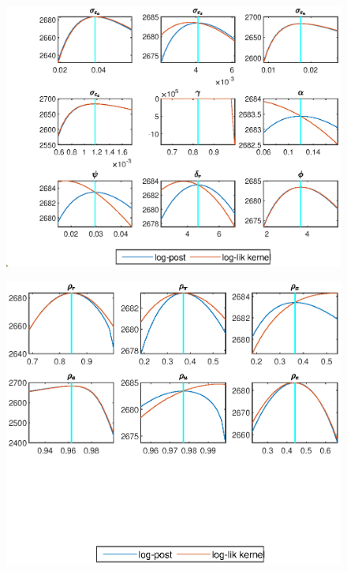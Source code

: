 \documentclass[11pt,preprint, authoryear]{elsarticle}
\let\origfigure\figure
\let\endorigfigure\endfigure
\renewenvironment{figure}[1][2] {
    \expandafter\origfigure\expandafter[H]
} {
    \endorigfigure
}
\numberwithin{equation}{section}
\numberwithin{figure}{section}
\numberwithin{table}{section}
\begin{document}
\begin{figure}
     \centering
     \begin{subfigure}[H]{0.49\textwidth}
         \centering
         \includegraphics[width=\textwidth]{code/mode_check1_extended}
     \end{subfigure}
     \begin{subfigure}[H]{0.49\textwidth}
         \centering
         \includegraphics[width=\textwidth]{code/mode_check2_extended}
     \end{subfigure}
        \caption{Estimated structural parameters mode check plots for extended sample under the Taylor rule (\ref{s1}). The difference in the shapes of the likelihood kernel (red line) and the posterior likelihood (blue line) indicates the role of the prior in influencing the curvature of the likelihood function.}
        \label{mc2}
\end{figure}
\end{document}
